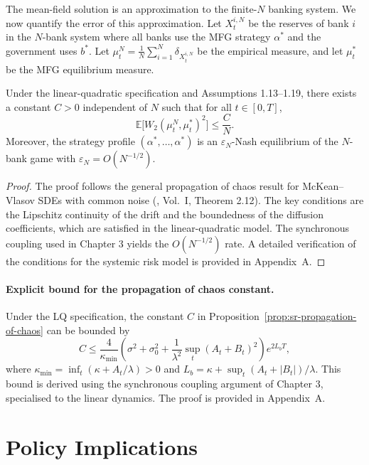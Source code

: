 The mean-field solution is an approximation to the finite-$N$ banking system. We now
quantify the error of this approximation. Let $X_t^{i,N}$ be the reserves of bank
$i$ in the $N$-bank system where all banks use the MFG strategy $\alpha^*$ and the
government uses $b^*$. Let $\mu_t^N = \frac{1}{N}\sum_{i=1}^N \delta_{X_t^{i,N}}$ be
the empirical measure, and let $\mu_t^*$ be the MFG equilibrium measure.

\begin{proposition}
\label{prop:sr-propagation-of-chaos}
Under the linear-quadratic specification and Assumptions 1.13--1.19, there exists a
constant $C > 0$ independent of $N$ such that for all $t \in [0,T]$,
\[
    \mathbb{E}\big[ W_2(\mu_t^N, \mu_t^*)^2 \big] \leq \frac{C}{N}.
\]
Moreover, the strategy profile $(\alpha^*, \dots, \alpha^*)$ is an $\varepsilon_N$-Nash
equilibrium of the $N$-bank game with $\varepsilon_N = O(N^{-1/2})$.
\end{proposition}

\begin{proof}
The proof follows the general propagation of chaos result for McKean--Vlasov SDEs
with common noise (\citep{carmonadelarue2018}, Vol.\ I, Theorem 2.12). The key
conditions are the Lipschitz continuity of the drift and the boundedness of the
diffusion coefficients, which are satisfied in the linear-quadratic model. The
synchronous coupling used in Chapter 3 yields the $O(N^{-1/2})$ rate. A detailed
verification of the conditions for the systemic risk model is provided in
Appendix~A.
\end{proof}

\paragraph{Explicit bound for the propagation of chaos constant.} Under the LQ
specification, the constant $C$ in Proposition~\ref{prop:sr-propagation-of-chaos}
can be bounded by
\[
    C \leq \frac{4}{\kappa_{\min}} \left( \sigma^2 + \sigma_0^2 + \frac{1}{\lambda^2}
    \sup_t (A_t + B_t)^2 \right) e^{2L_b T},
\]
where $\kappa_{\min} = \inf_t (\kappa + A_t/\lambda) > 0$ and
$L_b = \kappa + \sup_t (A_t + |B_t|)/\lambda$. This bound is derived using the
synchronous coupling argument of Chapter 3, specialised to the linear dynamics. The
proof is provided in Appendix~A.


\section{Policy Implications}
\label{sec:sr-policy}

